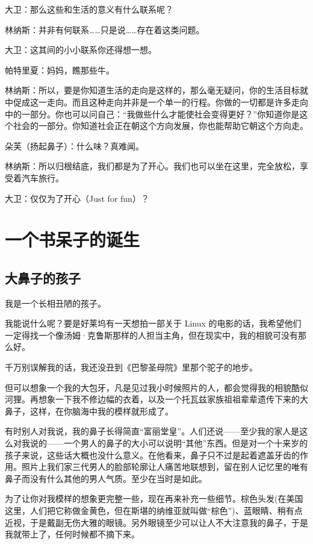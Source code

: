 \documentclass[12pt,UTF8]{ctexbook}
\begin{document}
大卫：那么这些和生活的意义有什么联系呢？

林纳斯：并非有何联系……只是说……存在着这类问题。

大卫：这其间的小小联系你还得想一想。

帕特里夏：妈妈，瞧那些牛。

林纳斯：所以，要是你知道生活的走向是这样的，那么毫无疑问，你的生活目标就中促成这一走向。而且这种走向并非是一个单一的行程。你做的一切都是许多走向中的一部分。你也可以问自己：“我做些什么才能使社会变得更好？”你知道你是这个社会的一部分。你知道社会正在朝这个方向发展，你也能帮助它朝这个方向走。

朵芙（扬起鼻子）：什么味？真难闻。

林纳斯：所以归根结底，我们都是为了开心。我们也可以坐在这里，完全放松，享受着汽车旅行。

大卫：仅仅为了开心（Just for fun）？

\mainmatter

\chapter{一个书呆子的诞生}

\section{大鼻子的孩子}

我是一个长相丑陋的孩子。

我能说什么呢？要是好莱坞有一天想拍一部关于 Linux 的电影的话，我希望他们一定得找一个像汤姆·克鲁斯那样的人担当主角，但在现实中，我的相貌可没有那么好。

千万别误解我的话，我还没丑到《巴黎圣母院》里那个驼子的地步。

但可以想象一个我的大包牙，凡是见过我小时候照片的人，都会觉得我的相貌酷似河狸。再想象一下我不修边幅的衣着，以及一个托瓦兹家族祖祖辈辈遗传下来的大鼻子，这样，在你脑海中我的模样就形成了。

有时别人对我说，我的鼻子长得简直“富丽堂皇”。人们还说——至少我的家人是这么对我说的——一个男人的鼻子的大小可以说明“其他”东西。但是对一个十来岁的孩子来说，这些话大概也没什么意义。在他看来，鼻子只不过是起着遮盖牙齿的作用。照片上我们家三代男人的脸部轮廓让人痛苦地联想到，留在别人记忆里的唯有鼻子而没有什么其他的男人气质。至少在当时是如此。

为了让你对我模样的想象更完整一些，现在再来补充一些细节。棕色头发(在美国这里，人们把它称做金黄色，但在斯堪的纳维亚就叫做“棕色”)、蓝眼睛、稍有点近视，于是戴副无伤大雅的眼镜。另外眼镜至少可以让人不大注意我的鼻子，于是我就带上了，任何时候都不摘下来。
\end{document}

